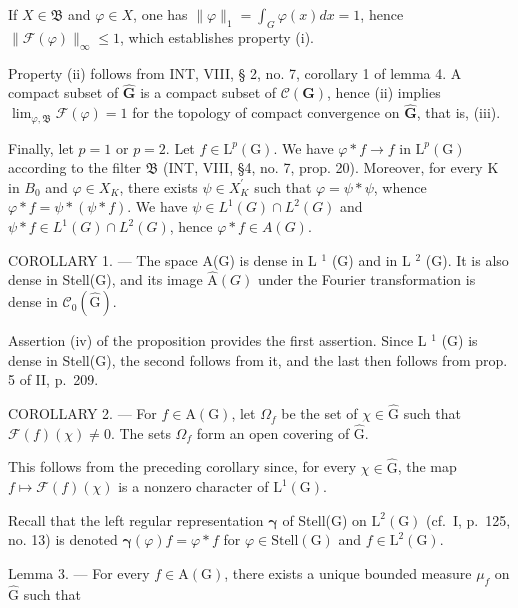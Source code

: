 If \(X \in \mathfrak{B}\) and \(\varphi \in X\), one has \(\| \varphi \|_1 = \int_{G} \varphi(x) dx = 1\), hence \(\| \mathcal{F}(\varphi) \|_\infty \leqslant 1\), which establishes property (i).

Property (ii) follows from INT, VIII, § 2, no. 7, corollary 1 of lemma 4. A compact subset of \(\widehat{\mathbf{G}}\) is a compact subset of \(\mathcal{C}(\mathbf{G})\), hence (ii) implies \(\lim_{\varphi, \mathfrak{B}} \mathcal{F}(\varphi) = 1\) for the topology of compact convergence on \(\widehat{\mathbf{G}}\), that is, (iii).

Finally, let \(p=1\) or \(p=2\). Let \(f\in\mathrm{L}^{p}(\mathrm{G})\). We have \(\varphi*f\to f\) in \(\mathrm{L}^{p}(\mathrm{G})\) according to the filter \(\mathfrak{B}\) (INT, VIII, §4, no. 7, prop. 20). Moreover, for every K in \(B_{0}\) and \(\varphi\in X_{K}\), there exists \(\psi\in X_{K}^{\prime}\) such that \(\varphi=\psi*\psi\), whence \(\varphi*f=\psi*(\psi*f)\). We have \(\psi\in L^{1}(G)\cap L^{2}(G)\) and \(\psi*f\in L^{1}(G)\cap L^{2}(G)\), hence \(\varphi*f\in A(G)\).

COROLLARY 1. --- The space A(G) is dense in L \(^{1}\) (G) and in L \(^{2}\) (G). It is also dense in Stell(G), and its image \(\widehat{\mathrm{A}}(G)\) under the Fourier transformation is dense in \(\mathcal{C}_{0}(\widehat{\mathrm{G}})\).

Assertion (iv) of the proposition provides the first assertion. Since L \(^{1}\) (G) is dense in Stell(G), the second follows from it, and the last then follows from prop. 5 of II, p.~209.

COROLLARY 2. --- For \(f \in \mathrm{A}(\mathrm{G})\), let \(\Omega_f\) be the set of \(\chi \in \widehat{\mathrm{G}}\) such that \(\mathcal{F}(f)(\chi) \neq 0\). The sets \(\Omega_f\) form an open covering of \(\widehat{\mathrm{G}}\).

This follows from the preceding corollary since, for every \(\chi \in \widehat{\mathrm{G}}\), the map \(f \mapsto \mathcal{F}(f)(\chi)\) is a nonzero character of \(\mathrm{L}^1(\mathrm{G})\).

Recall that the left regular representation \(\pmb{\gamma}\) of Stell(G) on \(\mathrm{L}^2 (\mathrm{G})\) (cf.~I, p.~125, no. 13) is denoted \(\pmb{\gamma}(\varphi)f = \varphi *f\) for \(\varphi \in \mathrm{Stell}(\mathrm{G})\) and \(f\in \mathrm{L}^2 (\mathrm{G})\).

Lemma 3. --- For every \(f \in \mathrm{A}(\mathrm{G})\), there exists a unique bounded measure \(\mu_{f}\) on \(\widehat{\mathrm{G}}\) such that

